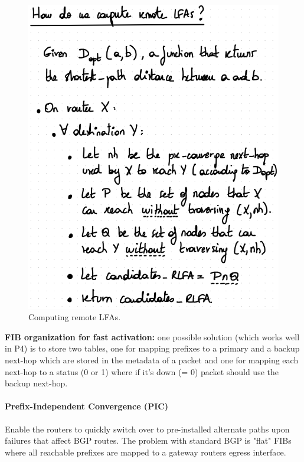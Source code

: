 \begin{figure}[h]
	\centering
	\includegraphics[scale=0.5]{images/4-remote.PNG}
	\caption{Computing remote LFAs.}
	\label{fig:remote}
\end{figure}

\textbf{FIB organization for fast activation:} one possible solution (which works well in P4) is to store two tables, one for mapping prefixes to a primary and a backup next-hop which are stored in the metadata of a packet and one for mapping each next-hop to a status (0 or 1) where if it's down (= 0) packet should use the backup next-hop.


\paragraph{Prefix-Independent Convergence (PIC)}
Enable the routers to quickly switch over to pre-installed alternate paths upon failures that affect BGP routes. The problem with standard BGP is "flat" FIBs where all reachable prefixes are mapped to a gateway routers egress interface.


